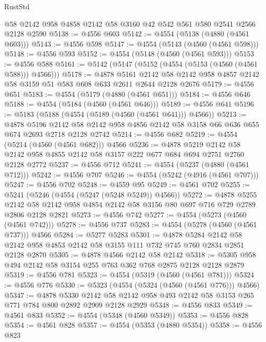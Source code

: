 \begin{lexlean}{RustStd}
\begin{coremodule}
    @58
    @2142
    @958
    @4858
    @2142
    @58
    @3160
    @42
    @542
    @561
    @580
    @2541
    @2566
    @2128
    @2590
@5138 := @4556 @603
@5142 := @4554 (@5138 (@4880 (@4561 @603)))
@5143 := @4556 @598
@5147 := @4554 (@5143 (@4560 (@4561 @598)))
@5148 := @4556 @593
@5152 := @4554 (@5148 (@4560 (@4561 @593)))
@5153 := @4556 @588
@5161 := @5142 (@5147 (@5152 (@4554 (@5153 (@4560 (@4561 @588))) @4566)))
@5178 := @4878
    @5161
    @2142
    @58
    @2142
    @958
    @4857
    @2142
    @58
    @3159
    @51
    @583
    @608
    @633
    @2611
    @2644
    @2128
    @2676
@5179 := @4556 @651
@5183 := @4554 (@5179 (@4880 (@4561 @651)))
@5184 := @4556 @646
@5188 := @4554 (@5184 (@4560 (@4561 @646)))
@5189 := @4556 @641
@5196 := @5183 (@5188 (@4554 (@5189 (@4560 (@4561 @641))) @4566))
@5213 := @4878
    @5196
    @2142
    @58
    @2142
    @958
    @4856
    @2142
    @58
    @3158
    @66
    @636
    @655
    @674
    @2693
    @2718
    @2128
    @2742
@5214 := @4556 @682
@5219 := @4554 (@5214 (@4560 (@4561 @682))) @4566
@5236 := @4878
    @5219
    @2142
    @58
    @2142
    @958
    @4855
    @2142
    @58
    @3157
    @222
    @677
    @684
    @694
    @2751
    @2760
    @2128
    @2772
@5237 := @4556 @712
@5241 := @4554 (@5237 (@4880 (@4561 @712)))
@5242 := @4556 @707
@5246 := @4554 (@5242 (@4916 (@4561 @707)))
@5247 := @4556 @702
@5248 := @4559 @95
@5249 := @4561 @702
@5255 := @5241 (@5246 (@4554 (@5247 (@5248 @5249)) @4566))
@5272 := @4878
    @5255
    @2142
    @58
    @2142
    @958
    @4854
    @2142
    @58
    @3156
    @80
    @697
    @716
    @729
    @2789
    @2806
    @2128
    @2821
@5273 := @4556 @742
@5277 := @4554 (@5273 (@4560 (@4561 @742)))
@5278 := @4556 @737
@5283 := @4554 (@5278 (@4560 (@4561 @737))) @4566
@5284 := @5277 @5283
@5301 := @4878
    @5284
    @2142
    @58
    @2142
    @958
    @4853
    @2142
    @58
    @3155
    @111
    @732
    @745
    @760
    @2834
    @2851
    @2128
    @2870
@5305 := @4878 @4566 @2142 @58 @2142
@5318 := @5305 @958 @494 @2142 @58 @3154 @255 @763 @362 @768 @2875 @2128 @2128 @2879
@5319 := @4556 @781
@5323 := @4554 (@5319 (@4560 (@4561 @781)))
@5324 := @4556 @776
@5330 := @5323 (@4554 (@5324 (@4560 (@4561 @776))) @4566)
@5347 := @4878
    @5330
    @2142
    @58
    @2142
    @958
    @493
    @2142
    @58
    @3153
    @265
    @771
    @784
    @800
    @2892
    @2909
    @2128
    @2929
@5348 := @4556 @833
@5349 := @4561 @833
@5352 := @4554 (@5348 (@4560 @5349))
@5353 := @4556 @828
@5354 := @4561 @828
@5357 := @4554 (@5353 (@4880 @5354))
@5358 := @4556 @823

\end{coremodule}
\end{lexlean}
